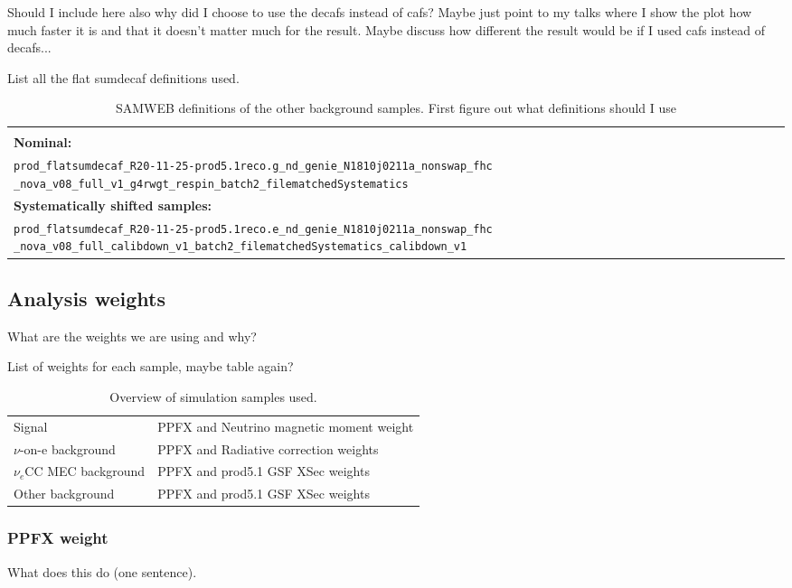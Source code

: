 \documentclass[12pt]{article}
\begin{document}
Should I include here also why did I choose to use the decafs instead of cafs? Maybe just point to my talks where I show the plot how much faster it is and that it doesn't matter much for the result. Maybe discuss how different the result would be if I used cafs instead of decafs...

List all the flat sumdecaf definitions used.
\begin{table}[!ht]
\centering
\begin{tabular}{p{\textwidth}}
\hline\hline\\
\textbf{Nominal:}\\
\texttt{prod\_flatsumdecaf\_R20-11-25-prod5.1reco.g\_nd\_genie\_N1810j0211a\_nonswap\_fhc} \texttt{\_nova\_v08\_full\_v1\_g4rwgt\_respin\_batch2\_filematchedSystematics}\\[2mm]
\textbf{Systematically shifted samples:}\\
\texttt{prod\_flatsumdecaf\_R20-11-25-prod5.1reco.e\_nd\_genie\_N1810j0211a\_nonswap\_fhc} \texttt{\_nova\_v08\_full\_calibdown\_v1\_batch2\_filematchedSystematics\_calibdown\_v1}\\[2mm]
\hline\hline
\end{tabular}
\caption{SAMWEB definitions of the other background samples. First figure out what definitions should I use}
\label{tab:SumDeCAFDefinitions}
\end{table}

\subsection{Analysis weights}
What are the weights we are using and why?

List of weights for each sample, maybe table again?
\begin{table}[!ht]
\centering
\def\arraystretch{1.4}
\begin{tabular}{l@{\hskip 1in}l}
Signal                   & PPFX and Neutrino magnetic moment weight\\
$\nu$-on-e background    & PPFX and Radiative correction weights\\
$\nu_e$CC MEC background & PPFX and prod5.1 GSF XSec weights\\
Other background         & PPFX and prod5.1 GSF XSec weights
\end{tabular}
\caption{Overview of simulation samples used.}
\label{tab:WeightsOverview}
\end{table}

\subsubsection*{PPFX weight}
What does this do (one sentence).
\end{document}
